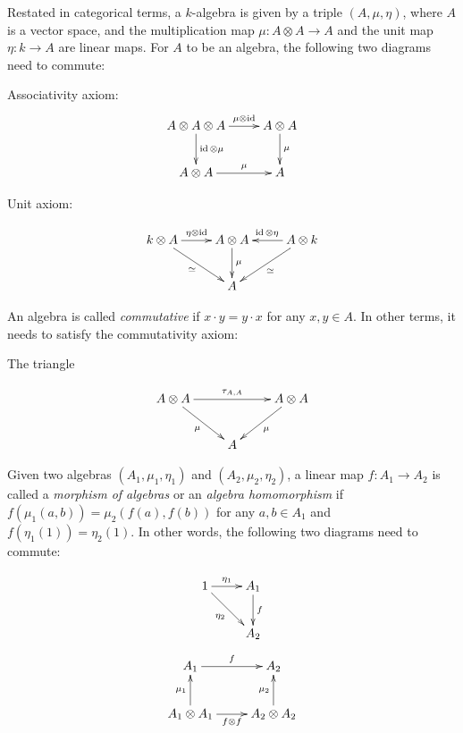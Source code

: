 Restated in categorical terms, a $k$-algebra is given by a triple $(A, \mu, \eta)$,
where $A$ is a vector space, and the multiplication map $\mu: A \otimes A \to A$ and the unit map $\eta: k \to A$
are linear maps. For $A$ to be an algebra, the following two diagrams need to commute:

Associativity axiom:
\begin{equation}
\xymatrix{
A \otimes A \otimes A \ar[d]^-{\id \otimes \mu} \ar[r]^-{\mu \otimes \id} & A \otimes A \ar[d]^-{\mu}\\
 A \otimes A \ar[r]^-\mu & A 
}
\end{equation}

Unit axiom: 

\begin{equation}
    \xymatrix{
    k \otimes A \ar[r]^-{\eta \otimes \id} \ar[rd]_\simeq & A \otimes A \ar[d]^-\mu & A \otimes k \ar[l]_{\id \otimes \eta} \ar[ld]^-{\simeq} \\
    & A &
    }
\end{equation}

An algebra is called \emph{commutative} if $x \cdot y = y \cdot x$ for any
$x,y\in A$. In other terms, it needs to satisfy the commutativity axiom:

The triangle 

\begin{equation}
    \xymatrix{
    A \otimes A \ar[rr]^-{\tau_{A,A}} \ar[rd]_\mu & & A \otimes A \ar[ld]^-\mu \\
    & A &
    }
\end{equation}

Given two algebras $(A_1, \mu_1, \eta_1)$ and $(A_2, \mu_2, \eta_2)$, a linear
map $f: A_1 \to A_2$ is called a \emph{morphism of algebras} or an
\emph{algebra homomorphism} if $f(\mu_1(a,b)) = \mu_2(f(a), f(b))$ for any
$a,b\in A_1$ and $f(\eta_1(1)) = \eta_2(1)$. In other words, the following two
diagrams need to commute:

\begin{equation}
    \xymatrix{
    1 \ar[r]^-{\eta_1} \ar[rd]_{\eta_2} & A_1 \ar[d]^-f \\
    & A_2
    }
\end{equation}
\begin{equation}
    \xymatrix{
    A_1 \ar[r]^-f & A_2 \\
    A_1 \otimes A_1 \ar[u]^-{\mu_1} \ar[r]_-{f\otimes f} & A_2 \otimes A_2 \ar[u]^-{\mu_2}
    }
\end{equation}


